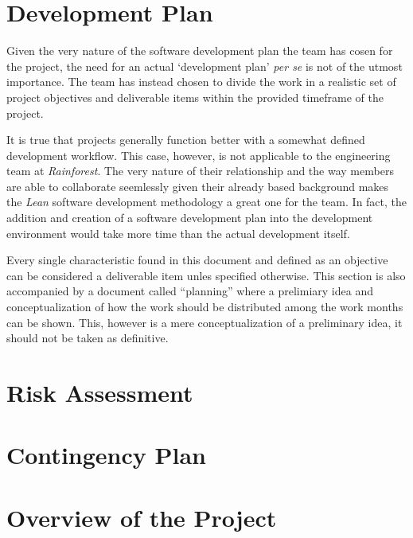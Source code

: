 \documentclass[english,runningheads,a4paper]{llncs}[2018/03/10]
\begin{document}
\section*{Development Plan}

Given the very nature of the software development plan the team has cosen for
the project, the need for an actual `development plan' \textit{per se} is not of
the utmost importance. The team has instead chosen to divide the work in a
realistic set of project objectives and deliverable items within the provided
timeframe of the project.

It is true that projects generally function better with a somewhat defined
development workflow. This case, however, is not applicable to the engineering
team at \textit{Rainforest}. The very nature of their relationship and the way
members are able to collaborate seemlessly given their already based background
makes the \textit{Lean} software development methodology a great one for the
team. In fact, the addition and creation of a software development plan into the
development environment would take more time than the actual development itself.

Every single characteristic found in this document and defined as an objective
can be considered a deliverable item unles specified otherwise. This section is
also accompanied by a document called ``planning'' where a prelimiary idea and
conceptualization of how the work should be distributed among the work months
can be shown. This, however is a mere conceptualization of a preliminary idea,
it should not be taken as definitive.


\section*{Risk Assessment}


\section*{Contingency Plan}


\section*{Overview of the Project}


\printbibliography
\end{document}
